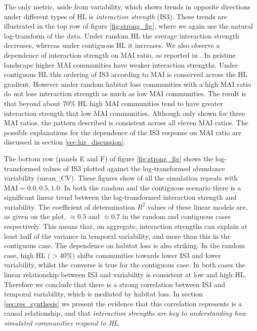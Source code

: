 The only metric, aside from variability, which shows trends in opposite directions under different types of HL is \emph{interaction strength} (IS3). These trends are illustrated in the top row of figure \ref{fig:strong_fig}, where we again use the natural log-transform of the data. Under random HL the average interaction strength decreases, whereas under contiguous HL it increases. We also observe a dependence of interaction strength on MAI ratio, as reported in \cite{lurgi2015effects}. In pristine landscape higher MAI communities have weaker interaction strengths. Under contiguous HL this ordering of IS3 according to MAI is conserved across the HL gradient. However under random habitat loss communities with a high MAI ratio do not lose interaction strength as much as low MAI communities. The result is that beyond about $70\%$ HL high MAI communities tend to have greater interaction strength that low MAI communities. Although only shown for three MAI ratios, the pattern described is consistent across all eleven MAI ratios. The possible explanations for the dependence of the IS3 response on MAI ratio are discussed in section \ref{sec:hir_discussion}.

The bottom row (panels E and F) of figure \ref{fig:strong_fig} shows the log-transformed values of IS3 plotted against the log-transformed abundance variability (mean\_CV). These figures show of all the simulation repeats with MAI$=0.0,0.5,1.0$. In both the random and the contiguous scenario there is a significant linear trend between the log-transformed interaction strength and variability. The coefficient of determination $R^2$ values of these linear models are, as given on the plot, $\approx 0.5$ and $\approx 0.7$ in the random and contiguous cases respectively. This means that, on aggregate, interaction strengths can explain at least half of the variance in temporal variability, and more than this in the contiguous case. The dependence on habitat loss is also striking. In the random case, high HL ($>40\%$) shifts communities towards lower IS3 and lower variability, whilst the converse is true for the contiguous case. In both cases the linear relationship between IS3 and variability is consistent at low and high HL. Therefore we conclude that there is a strong correlation between IS3 and temporal variability, which is mediated by habitat loss. In section \ref{sec:res_synthesis} we present the evidence that this correlation represents is a causal relationship, and that \emph{interaction strengths are key to understanding how simulated communities respond to HL}.   

